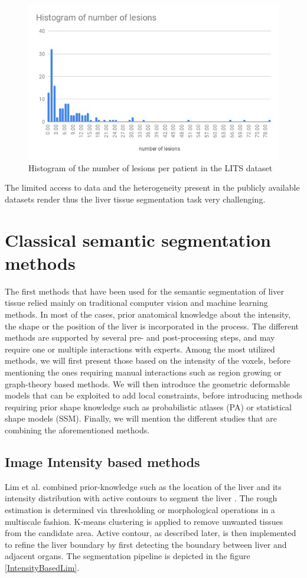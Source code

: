 \documentclass[]{article}
\begin{document}
	\begin{figure}[!ht]
		\centering
		\includegraphics[width=0.7\linewidth]{images/image11}
		\caption{Histogram of the number of lesions per patient in the LITS dataset}
		\label{NumberOfLesionsLits}
	\end{figure}
	The limited access to data and the heterogeneity present in the publicly
	available datasets render thus the liver tissue segmentation task very
	challenging.
	
	\section*{Classical semantic segmentation methods}
	
	The first methods that have been used for the semantic segmentation of
	liver tissue relied mainly on traditional computer vision and machine
	learning methods. In most of the cases, prior anatomical knowledge about
	the intensity, the shape or the position of the liver is incorporated in
	the process. The different methods are supported by several pre- and
	post-processing steps, and may require one or multiple interactions with
	experts.
	Among the most utilized methods, we will first present those based on
	the intensity of the voxels, before mentioning the ones requiring manual
	interactions such as region growing or graph-theory based methods. We will then introduce the geometric deformable models that can be exploited to add local constraints, before introducing methods requiring prior shape knowledge such as
	probabilistic atlases (PA) or statistical shape models (SSM).
	Finally, we will mention the different studies that are combining the
	aforementioned methods.
	
	\subsection*{Image Intensity based methods}
	
	Lim et al. combined prior-knowledge such as the location of the liver
	and its intensity distribution with active contours to segment the
	liver \cite{Lim2004, Lim2005, Lim2006}. The rough estimation is determined via thresholding or
	morphological operations in a multiscale fashion. K-means clustering is
	applied to remove unwanted tissues from the candidate area. Active
	contour, as described later, is then implemented to refine the liver boundary by first
	detecting the boundary between liver and adjacent organs.
	The segmentation pipeline is depicted in the figure \ref{IntensityBasedLim}.
	
\end{document}
